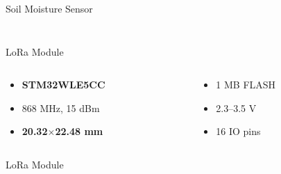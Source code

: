 \documentclass{beamer}
\begin{document}
\begin{frame}{Soil Moisture Sensor}
\begin{columns}[T]
\begin{column}{.5\textwidth}
\begin{figure}
    \end{figure}
\end{column}
\end{columns}
\end{frame}


\begin{frame}{LoRa Module}
\begin{figure}
    \centering
    \small
    
\end{figure}
\begin{columns}[T]
\begin{column}{.5\textwidth}
    \begin{itemize}
        \item \textbf{STM32WLE5CC}
        \item 868 MHz, 15 dBm
        \item \textbf{20.32}$\mathbf{\times}$\textbf{22.48 mm}
    \end{itemize}
\end{column}
\hfill
\begin{column}{.5\textwidth}
    \begin{itemize}
        \item 1 MB FLASH
        \item 2.3--3.5 V
        \item 16 IO pins
    \end{itemize}
\end{column}
\end{columns}
\end{frame}


\begin{frame}{LoRa Module}
\begin{figure}
    
\end{figure}
\begin{figure}
    
\end{figure}
\end{frame}
\end{document}
